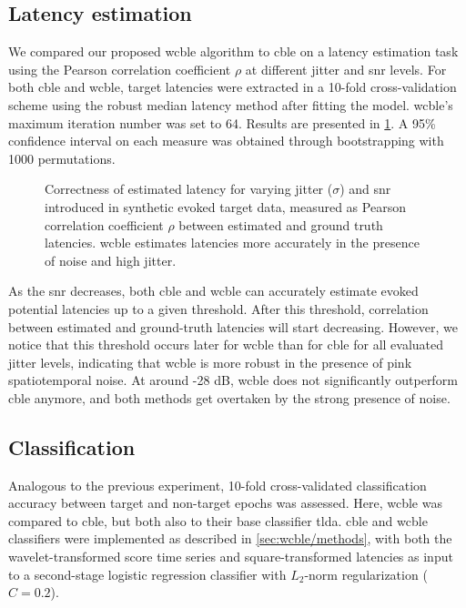 \subsection{Latency estimation}
We compared our proposed \ac{wcble} algorithm to \ac{cble} on a latency
estimation task using the Pearson correlation coefficient $\rho$ at different
jitter and \ac{snr} levels.
For both \ac{cble} and \ac{wcble}, target latencies were extracted in a
10-fold cross-validation scheme using the robust median latency method after
fitting the model.
\Ac{wcble}'s maximum iteration number was set to 64.
Results are presented in \cref{fig:wcble/results/latency}.
A 95\% confidence interval on each measure was obtained through bootstrapping
with 1000 permutations.

\begin{figure}
  \sffamily\sansmath
  
  \caption[Synthetic latency estimation results]{Correctness of estimated
  latency for varying jitter ($\sigma$) and \ac{snr} introduced in synthetic evoked target
  data, measured as Pearson correlation coefficient $\rho$ between
  estimated and ground truth latencies.
  \Ac{wcble} estimates latencies more accurately in the presence of noise and
  high jitter.}
  \label{fig:wcble/results/latency}
\end{figure}

As the \ac{snr} decreases, both \ac{cble} and \ac{wcble} can accurately
estimate evoked potential latencies up to a given threshold. After this
threshold, correlation between estimated and ground-truth latencies will start
decreasing.
However, we notice that this threshold occurs later for \ac{wcble} than for
\ac{cble} for all evaluated jitter levels, indicating that \ac{wcble} is more
robust in the presence of pink spatiotemporal noise.
At around -28 dB, \ac{wcble} does not significantly outperform \ac{cble}
anymore, and both methods get overtaken by the strong presence of noise.


\subsection{Classification}

Analogous to the previous experiment, 10-fold cross-validated classification
accuracy between target and non-target epochs was assessed.
Here, \ac{wcble} was compared to \ac{cble}, but both also to their base classifier
\ac{tlda}.
\Ac{cble} and \ac{wcble} classifiers were implemented as described
in \cref{sec:wcble/methods}, with both the wavelet-transformed score time series
and square-transformed latencies as input to a second-stage logistic regression
classifier with $L_2$-norm regularization ($C=0.2$).

